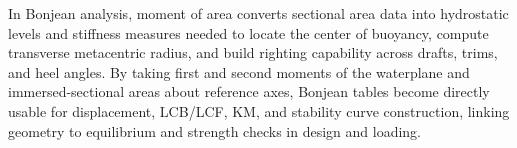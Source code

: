 \documentclass[12pt,a4paper,twoside]{report}
\begin{document}
\vspace{\baselineskip}\par\noindent In Bonjean analysis, moment of area converts sectional area data into
hydrostatic levels and stiffness measures needed to locate the center
of buoyancy, compute transverse metacentric radius, and build righting
capability across drafts, trims, and heel angles. By taking first and
second moments of the waterplane and immersed-sectional areas about
reference axes, Bonjean tables become directly usable for displacement,
LCB/LCF, KM, and stability curve construction, linking geometry to
equilibrium and strength checks in design and loading.
\begin{table}[H]
\centering
\caption{Bonjean Momnets}
\vspace{2mm}
\label{tab:first_moments}

\end{table}
\end{document}
